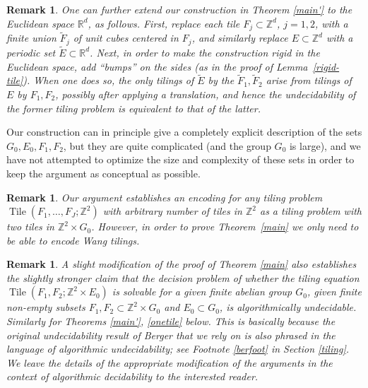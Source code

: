 \documentclass[reqno,a4paper,12pt]{amsart}
\numberwithin{equation}{section}
\numberwithin{figure}{section}
\def\R{\mathbb{R}}
\def\Z{\mathbb{Z}}
\newcommand{\Tile}{\operatorname{Tile}}
\theoremstyle{plain}
\newtheorem{remark}[thm]{Remark}
\theoremstyle{definition}
\newcommand{\thmref}[1]{Theorem~\ref{#1}}
\newcommand{\lemref}[1]{Lemma~\ref{#1}}
\begin{document}
\begin{remark}\label{extend_Rd}
One can further extend our construction in Theorem \ref{main'} to the Euclidean space $\R^d$, as follows. First,  replace each tile $F_j\subset \Z^d$, $j=1,2$, with a finite union $\tilde F_j$ of unit cubes centered in $F_j$, and similarly replace $E \subset \Z^d$ with a periodic set $\tilde E \subset \R^d$. Next, in order to make the construction rigid in the Euclidean space,  add ``bumps'' on the sides (as in the proof of \lemref{rigid-tile}).  When one does so, the only tilings of $\tilde E$ by the $\tilde F_1, \tilde F_2$ arise from tilings of $E$ by $F_1,F_2$, possibly after applying a translation, and hence the undecidability of the former tiling problem is equivalent to that of the latter.  
\end{remark}




Our construction can in principle give a completely explicit description of the sets $G_0, E_0, F_1, F_2$, but they are quite complicated (and the group $G_0$ is  large), and we have not attempted to optimize the size and complexity of these sets in order to keep the argument as conceptual as possible.



\begin{remark}
Our argument establishes an encoding for \emph{any} tiling problem $\Tile(F_1,\dots,F_J; \Z^2)$ with arbitrary number of tiles in $\Z^2$ as a tiling problem with two tiles in $\Z^2\times G_0$. However, in order to prove \thmref{main} we only need to be able to encode Wang tilings.
\end{remark}





\begin{remark}\label{algo}  A slight modification of the proof of Theorem \ref{main} also establishes the slightly stronger claim that the decision problem of whether the tiling equation $\Tile(F_1,F_2; \Z^2 \times E_0)$ is solvable for a given finite abelian group $G_0$, given finite non-empty subsets $F_1,F_2 \subset \Z^2 \times G_0$ and $E_0 \subset G_0$, is \emph{algorithmically} undecidable.  Similarly for Theorems \ref{main'}, \ref{onetile} below.  This is basically because the original undecidability result of Berger \cite{Ber} that we rely on is also phrased in the language of algorithmic undecidability; see Footnote \ref{berfoot} in Section \ref{tiling}.  We leave the details of the appropriate modification of the arguments in the context of algorithmic decidability to the interested reader.  
\end{remark}
\end{document}
